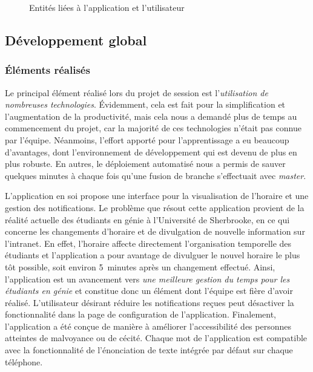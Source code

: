     \begin{figure}[p] \centering
        
        \caption{Entités liées à l'application et l'utilisateur}
        \label{fig.persistance}
    \end{figure}
    
    
    \pagebreak
    \subsection{Développement global}
        \subsubsection{Éléments réalisés}
        Le principal élément réalisé lors du projet de session est l'\emph{utilisation de nombreuses technologies}. Évidemment, cela est fait pour la simplification et l'augmentation de la productivité, mais cela nous a demandé plus de temps au commencement du projet, car la majorité de ces technologies n'était pas connue par l'équipe. Néanmoins, l'effort apporté pour l'apprentissage a eu beaucoup d'avantages, dont l'environnement de développement qui est devenu de plus en plus robuste. En autres, le déploiement automatisé nous a permis de sauver quelques minutes à chaque fois qu'une fusion de branche s'effectuait avec \emph{master}.
    
        L'application en soi propose une interface pour la visualisation de l'horaire et une gestion des notifications. Le problème que résout cette application provient de la réalité actuelle des étudiants en génie à l'Université de Sherbrooke, en ce qui concerne les changements d'horaire et de divulgation de nouvelle information sur l'intranet. En effet, l'horaire affecte directement l'organisation temporelle des étudiants et l'application a pour avantage de divulguer le nouvel horaire le plus tôt possible, soit environ 5~minutes après un changement effectué. Ainsi, l'application est un avancement vers \emph{une meilleure gestion du temps pour les étudiants en génie} et constitue donc un élément dont l'équipe est fière d'avoir réalisé. L'utilisateur désirant réduire les notifications reçues peut désactiver la fonctionnalité dans la page de configuration de l'application. Finalement, l'application a été conçue de manière à améliorer l'accessibilité des personnes atteintes de malvoyance ou de cécité. Chaque mot de l'application est compatible avec la fonctionnalité de l'énonciation de texte intégrée par défaut sur chaque téléphone.

